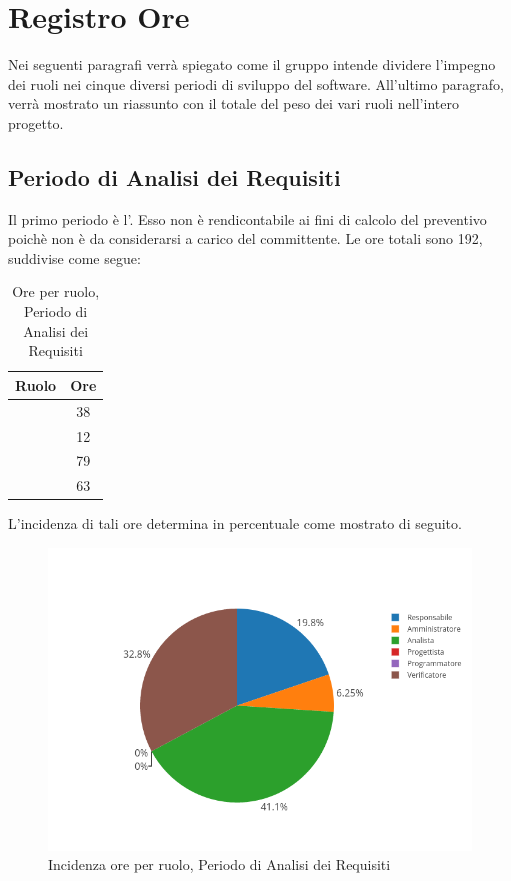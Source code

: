 \newpage
\section{Registro Ore}
Nei seguenti paragrafi verrà spiegato come il gruppo intende dividere l'impegno dei ruoli nei cinque diversi periodi di sviluppo del software. All'ultimo paragrafo, verrà mostrato un riassunto con il totale del peso dei vari ruoli nell'intero progetto.

\subsection{Periodo di Analisi dei Requisiti}
Il primo periodo è l'\AdR. Esso non è rendicontabile ai fini di calcolo del preventivo poichè non è da considerarsi a carico del committente. Le ore totali sono 192, suddivise come segue:

\begin{table}[H]
	\begin{center}
		\begin{tabular}{|c|c|}
			\hline
			\textbf{Ruolo}	& \textbf{Ore} \\
			\hline
			\Res	&	38	\\
			\hline
			\Amm	&	12	\\
			\hline
			\Ana	&	79	\\
			\hline
			\Ver	&	63	\\
			\hline
		\end{tabular}
	\end{center}
	\caption{Ore per ruolo, Periodo di Analisi dei Requisiti}
\end{table}

L'incidenza di tali ore determina in percentuale come mostrato di seguito.
\begin{figure}[H]
	\centering
	\includegraphics[scale=0.6]{img/AnalisiRequisiiti.png}
	\caption{Incidenza ore per ruolo, Periodo di Analisi dei Requisiti}
\end{figure}

